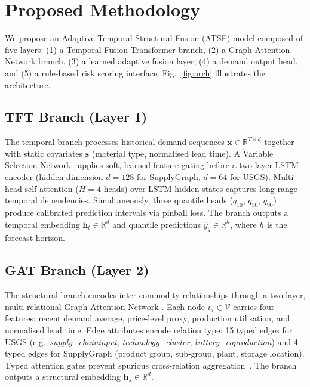 
\section{Proposed Methodology}
\label{sec:methodology}

We propose an Adaptive Temporal-Structural Fusion (ATSF) model
composed of five layers: (1) a Temporal Fusion Transformer branch,
(2) a Graph Attention Network branch, (3) a learned adaptive fusion
layer, (4) a demand output head, and (5) a rule-based risk scoring
interface. Fig.~\ref{fig:arch} illustrates the architecture.

\subsection{TFT Branch (Layer 1)}

The temporal branch processes historical demand sequences
$\mathbf{x} \in \mathbb{R}^{T \times d}$ together with static
covariates $\mathbf{s}$ (material type, normalised lead time). A
Variable Selection Network~\cite{lim2021tft} applies soft,
learned feature gating before a two-layer LSTM encoder (hidden
dimension $d{=}128$ for SupplyGraph, $d{=}64$ for USGS).
Multi-head self-attention ($H{=}4$ heads) over LSTM hidden states
captures long-range temporal dependencies.  Simultaneously, three
quantile heads ($q_{10}$, $q_{50}$, $q_{90}$) produce calibrated
prediction intervals via pinball loss. The branch outputs a
temporal embedding $\mathbf{h}_t \in \mathbb{R}^d$ and quantile
predictions $\hat{y}_{q} \in \mathbb{R}^{h}$, where $h$ is the
forecast horizon.

\subsection{GAT Branch (Layer 2)}

The structural branch encodes inter-commodity relationships through
a two-layer, multi-relational Graph Attention Network
\cite{velickovic2018gat}. Each node $v_i \in \mathcal{V}$ carries
four features: recent demand average, price-level proxy, production
utilisation, and normalised lead time. Edge attributes encode
relation type: 15 typed edges for USGS (e.g.\ \textit{supply\_chain\-input},
\textit{technology\_cluster}, \textit{battery\_coproduction}) and
4 typed edges for SupplyGraph (product group, sub-group, plant,
storage location). Typed attention gates prevent spurious
cross-relation aggregation~\cite{wasi2024gnn}. The branch outputs
a structural embedding $\mathbf{h}_s \in \mathbb{R}^d$.

